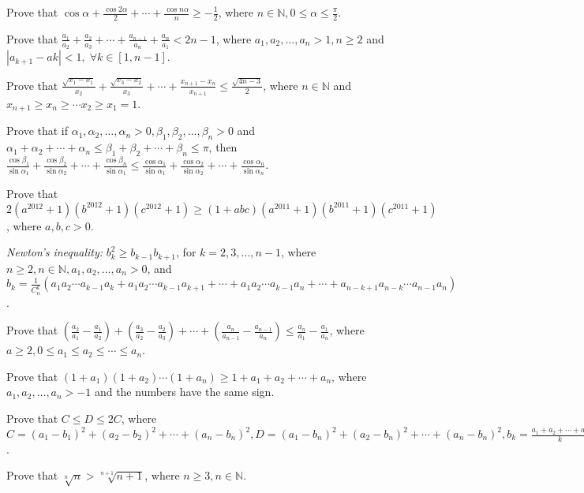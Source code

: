 \item Prove that $\cos\alpha + \frac{\cos2\alpha}{2} + \cdots + \frac{\cos n\alpha}{n}\geq -\frac{1}{2}$, where $n\in\mathbb{N},
  0\leq \alpha\leq \frac{\pi}{2}$.
\item Prove that $\frac{a_1}{a_2} + \frac{a_2}{a_3} + \cdots + \frac{a_{n - 1}}{a_n} + \frac{a_n}{a_1} < 2n - 1$, where $a_1, a_2,
  \ldots, a_n >  1, n\geq 2$ and $|a_{k + 1} - ak| < 1,\;\forall k\in[1, n - 1]$.
\item Prove that $\frac{\sqrt{x_1 - x_1}}{x_2} + \frac{\sqrt{x_3 - x_2}}{x_3} + \cdots + \frac{x_{n + 1} - x_n}{x_{n + 1}}\leq
  \frac{\sqrt{4n - 3}}{2}$, where $n\in\mathbb{N}$ and $x_{n + 1} \geq x_n \geq \cdots x_2\geq x_1 = 1$.
\item Prove that if $\alpha_1, \alpha_2, \ldots, \alpha_n > 0, \beta_1, \beta_2, \ldots, \beta_n > 0$ and $\alpha_1 + \alpha_2 +
  \cdots + \alpha_n \leq \beta_1 + \beta_2 + \cdots + \beta_n\leq\pi$, then $\frac{\cos\beta_1}{\sin\alpha_1} +
  \frac{\cos\beta_2}{\sin\alpha_2} + \cdots + \frac{\cos\beta_n}{\sin\alpha_1}\leq\frac{\cos\alpha_1}{\sin\alpha_1} +
  \frac{\cos\alpha_2}{\sin\alpha_2} + \cdots + \frac{\cos\alpha_n}{\sin\alpha_n}$.
\item Prove that $2(a^{2012} + 1)(b^{2012} + 1)(c^{2012} + 1)\geq (1 + abc)(a^{2011} + 1)(b^{2011} + 1)(c^{2011} + 1)$, where $a,
  b, c > 0$.
\item {\it Newton's inequality:} $b_k^2\geq b_{k - 1}b_{k + 1}$, for $k = 2, 3, \ldots, n -1$, where $n\geq 2, n\in\mathbb{N}, a_1,
  a_2, \ldots, a_n > 0$, and $b_k = \frac{1}{C_n^{k}}(a_1a_2\cdots a_{k - 1}a_k + a_1a_2\cdots a_{k - 1}a_{k + 1} + \cdots +
  a_1a_2\cdots a_{k - 1}a_n + \cdots + a_{n - k + 1}a_{n - k}\cdots a_{n - 1}a_n)$.
\item Prove that $\left(\frac{a_2}{a_1} - \frac{a_1}{a_2}\right) + \left(\frac{a_3}{a_2} - \frac{a_2}{a_3}\right) + \cdots +
  \left(\frac{a_n}{a_{n - 1}} - \frac{a_{n - 1}}{a_n}\right)\leq \frac{a_n}{a_1} - \frac{a_1}{a_n}$, where $a\geq 2, 0\leq a_1\leq
  a_2\leq \cdots \leq a_n$.
\item Prove that $(1 + a_1)(1 + a_2) \cdots (1 + a_n)\geq 1 + a_1 + a_2 + \cdots + a_n$, where $a_1, a_2, \ldots, a_n > -1$ and the
  numbers have the same sign.
\item Prove that $C\leq D\leq 2C$, where $C = (a_1 - b_1)^2 + (a_2 - b_2)^2 + \cdots + (a_n - b_n)^2, D = (a_1 - b_n)^2 + (a_2 -
  b_n)^2 + \cdots + (a_n - b_n)^2, b_k = \frac{a_1 + a_2 + \cdots + a_k}{k}, k = 1, 2, \ldots, n$.
\item Prove that $\sqrt[n]{n} > \sqrt[n + 1]{n +1}$, where $n\geq 3, n\in\mathbb{N}$.
